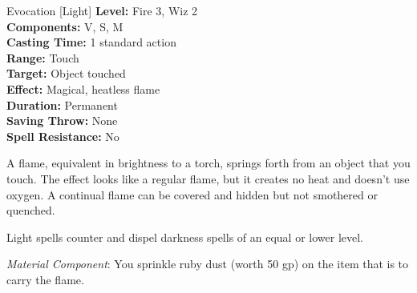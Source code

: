 {Evocation [Light]}
{
	\textbf{Level:}
	Fire 3, Wiz 2\\
	\textbf{Components:}
	V, S, M\\
	\textbf{Casting Time:}
	1 standard action\\
	\textbf{Range:}
	Touch\\
	\textbf{Target:}
	Object touched\\
	\textbf{Effect:}
	Magical, heatless flame\\
	\textbf{Duration:}
	Permanent\\
	\textbf{Saving Throw:}
	None\\
	\textbf{Spell Resistance:}
	No\\
}
{
	A flame, equivalent in brightness to a torch, springs forth from an object that you touch. The effect looks like a regular flame, but it creates no heat and doesn't use oxygen. A continual flame can be covered and hidden but not smothered or quenched.

	Light spells counter and dispel darkness spells of an equal or lower level.

	\textit{Material Component}:
	You sprinkle ruby dust (worth 50 gp) on the item that is to carry the flame.

}
